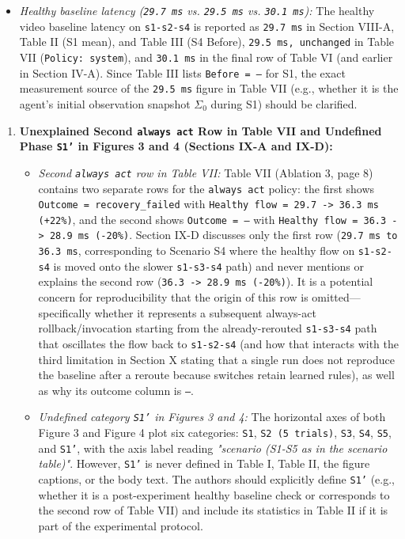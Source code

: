 \documentclass[11pt,a4paper]{article}
\begin{document}
\begin{itemize}[leftmargin=1.8em,itemsep=2pt]
\item \emph{Healthy baseline latency (\texttt{29.7 ms} vs. \texttt{29.5 ms} vs. \texttt{30.1 ms}):} The healthy video baseline latency on \texttt{s1-s2-s4} is reported as \texttt{29.7 ms} in Section VIII-A, Table II (S1 mean), and Table III (S4 Before), \texttt{29.5 ms, unchanged} in Table VII (\texttt{Policy: system}), and \texttt{30.1 ms} in the final row of Table VI (and earlier in Section IV-A). Since Table III lists \texttt{Before = –} for S1, the exact measurement source of the \texttt{29.5 ms} figure in Table VII (e.g., whether it is the agent's initial observation snapshot $\Sigma_0$ during S1) should be clarified.
\end{itemize}
\begin{enumerate}[leftmargin=1.6em,itemsep=3pt]
\item \textbf{Unexplained Second \texttt{always act} Row in Table VII and Undefined Phase \texttt{S1'} in Figures 3 and 4 (Sections IX-A and IX-D):}
\begin{itemize}[leftmargin=1.8em,itemsep=2pt]
\item \emph{Second \texttt{always act} row in Table VII:} Table VII (Ablation 3, page 8) contains two separate rows for the \texttt{always act} policy: the first shows \texttt{Outcome = recovery\_failed} with \texttt{Healthy flow = 29.7 -> 36.3 ms (+22\%)}, and the second shows \texttt{Outcome = --} with \texttt{Healthy flow = 36.3 -> 28.9 ms (-20\%)}. Section IX-D discusses only the first row (\texttt{29.7 ms to 36.3 ms}, corresponding to Scenario S4 where the healthy flow on \texttt{s1-s2-s4} is moved onto the slower \texttt{s1-s3-s4} path) and never mentions or explains the second row (\texttt{36.3 -> 28.9 ms (-20\%)}). It is a potential concern for reproducibility that the origin of this row is omitted—specifically whether it represents a subsequent always-act rollback/invocation starting from the already-rerouted \texttt{s1-s3-s4} path that oscillates the flow back to \texttt{s1-s2-s4} (and how that interacts with the third limitation in Section X stating that a single run does not reproduce the baseline after a reroute because switches retain learned rules), as well as why its outcome column is \texttt{--}.
\item \emph{Undefined category \texttt{S1'} in Figures 3 and 4:} The horizontal axes of both Figure 3 and Figure 4 plot six categories: \texttt{S1}, \texttt{S2 (5 trials)}, \texttt{S3}, \texttt{S4}, \texttt{S5}, and \texttt{S1'}, with the axis label reading \emph{"scenario (S1-S5 as in the scenario table)"}. However, \texttt{S1'} is never defined in Table I, Table II, the figure captions, or the body text. The authors should explicitly define \texttt{S1'} (e.g., whether it is a post-experiment healthy baseline check or corresponds to the second row of Table VII) and include its statistics in Table II if it is part of the experimental protocol.
\end{itemize}
\end{enumerate}
\end{document}
